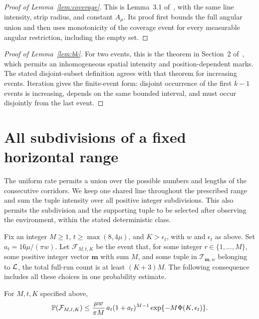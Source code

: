 \documentclass[11pt,letterpaper]{article}
\begin{document}
\begin{proof}[Proof of Lemma~\ref{lem:coverage}]
This is Lemma~3.1 of~\cite{CR26}, with the same line intensity, strip radius, and constant $A_\mu$. Its proof first bounds the full angular union and then uses monotonicity of the coverage event for every measurable angular restriction, including the empty set.
\end{proof}

\begin{proof}[Proof of Lemma~\ref{lem:bk}]
For two events, this is the theorem in Section~2 of~\cite{vdB96}, which permits an inhomogeneous spatial intensity and position-dependent marks. The stated disjoint-subset definition agrees with that theorem for increasing events. Iteration gives the finite-event form: disjoint occurrence of the first $k-1$ events is increasing, depends on the same bounded interval, and must occur disjointly from the last event.
\end{proof}

\section{All subdivisions of a fixed horizontal range}

The uniform rate permits a union over the possible numbers and lengths of the consecutive corridors. We keep one shared line throughout the prescribed range and sum the tuple intensity over all positive integer subdivisions. This also permits the subdivision and the supporting tuple to be selected after observing the environment, within the stated deterministic class.

Fix an integer $M\ge1$, $t\ge\max(8,4\mu)$, and $K>\epsilon_t$, with $w$ and $\epsilon_t$ as above. Set $a_t=16\mu/(\pi w)$. Let $\mathcal F_{M,t,K}$ be the event that, for some integer $r\in\{1,\ldots,M\}$, some positive integer vector $\boldsymbol m$ with sum $M$, and some tuple in $\mathcal T_{\boldsymbol m,w}$ belonging to $\cL$, the total full-run count is at least $(K+3)M$. The following consequence includes all these choices in one probability estimate.

\begin{corollary}\label{cor:subdivisions}
For $M,t,K$ specified above,
\begin{equation}\label{eq:subdivisions}
 \P(\mathcal F_{M,t,K})
 \le\frac{\mu w}{\pi M}\,a_t(1+a_t)^{M-1}
                  \exp\{-M\Phi(K,\epsilon_t)\}.
\end{equation}
\end{corollary}
\end{document}
